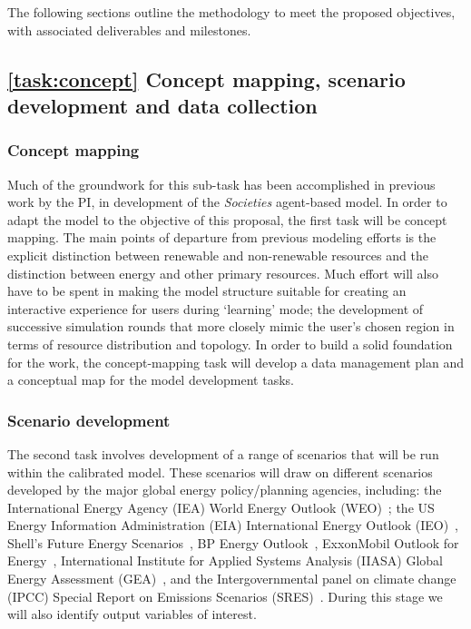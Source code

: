 \documentclass[11pt,a4paper]{article}
\begin{document}
The following sections outline the methodology to meet the proposed objectives, with associated deliverables and milestones.

\subsection{\ref{task:concept} Concept mapping, scenario development and data collection}
\label{sec:task:concept}

\subsubsection{Concept mapping}

Much of the groundwork for this sub-task 
has been accomplished in previous work by the PI,
in development of the \emph{Societies} agent-based model.
In order to adapt the model to the objective of this proposal,
the first task will be concept mapping.
The main points of departure from previous modeling efforts
is the explicit distinction between renewable and non-renewable resources
and the distinction between energy and other primary resources.
Much effort will also have to be spent in making the model structure suitable for
creating an interactive experience for users during `learning' mode;
the development of successive simulation rounds 
that more closely mimic the user's chosen region
in terms of resource distribution and topology.
In order to build a solid foundation for the work, 
the concept-mapping task will develop
a data management plan and 
a conceptual map for the model development tasks.

\subsubsection{Scenario development}

The second task involves 
development of a range of scenarios 
that will be run within the calibrated model. 
These scenarios will draw on different scenarios 
developed by the major 
global energy policy/planning agencies, including: 
the International Energy Agency (IEA) World Energy Outlook (WEO)~\cite{IEA20xx}; 
the US Energy Information Administration (EIA) International Energy Outlook (IEO)~\cite{EIA20xx}, 
Shell's Future Energy Scenarios~\cite{Shell20xx}, 
BP Energy Outlook~\cite{BP20xx}, 
ExxonMobil Outlook for Energy~\cite{Exxon20xx}, 
International Institute for Applied Systems Analysis (IIASA) Global Energy Assessment (GEA)~\cite{IIASA2012}, and 
the Intergovernmental panel on climate change (IPCC)
Special Report on Emissions Scenarios (SRES)~\cite{IPCC2000}. 
During this stage we will also identify output variables of interest.
\end{document}
